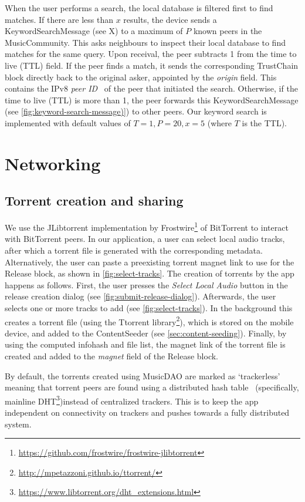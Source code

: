 When the user performs a search, the local database is filtered first to find matches. If there are less than \(x\) results, the device sends a KeywordSearchMessage (see X) to a maximum of \(P\) known peers in the MusicCommunity. This asks neighbours to inspect their local database to find matches for the same query. Upon receival, the peer subtracts 1 from the time to live (TTL) field. If the peer finds a match, it sends the corresponding TrustChain block directly back to the original asker, appointed by the \textit{origin} field. This contains the IPv8 \textit{peer ID}~\citep{mattskala2020} of the peer that initiated the search. Otherwise, if the time to live (TTL) is more than 1, the peer forwards this KeywordSearchMessage (see \ref{fig:keyword-search-message)}) to other peers. Our keyword search is implemented with default values of \(T=1, P=20, x=5\) (where \(T\) is the TTL).

\section{Networking}
\subsection{Torrent creation and sharing}
\label{sec:torrent-creation}
We use the JLibtorrent implementation by Frostwire\footnote{\url{https://github.com/frostwire/frostwire-jlibtorrent}} of BitTorrent to interact with BitTorrent peers. In our application, a user can select local audio tracks, after which a torrent file is generated with the corresponding metadata. Alternatively, the user can paste a preexisting torrent magnet link to use for the Release block, as shown in \ref{fig:select-tracks}. The creation of torrents by the app happens as follows. First, the user presses the \textit{Select Local Audio} button in the release creation dialog (see \ref{fig:submit-release-dialog}). Afterwards, the user selects one or more tracks to add (see \ref{fig:select-tracks}). In the background this creates a torrent file (using the Ttorrent library\footnote{\url{http://mpetazzoni.github.io/ttorrent/}}), which is stored on the mobile device, and added to the ContentSeeder (see \ref{sec:content-seeding}). Finally, by using the computed infohash and file list, the magnet link of the torrent file is created and added to the \textit{magnet} field of the Release block.

By default, the torrents created using MusicDAO are marked as `trackerless' meaning that torrent peers are found using a distributed hash table~\citep{dht2019} (specifically, mainline DHT\footnote{\url{https://www.libtorrent.org/dht_extensions.html}})instead of centralized trackers. This is to keep the app independent on connectivity on trackers and pushes towards a fully distributed system.

